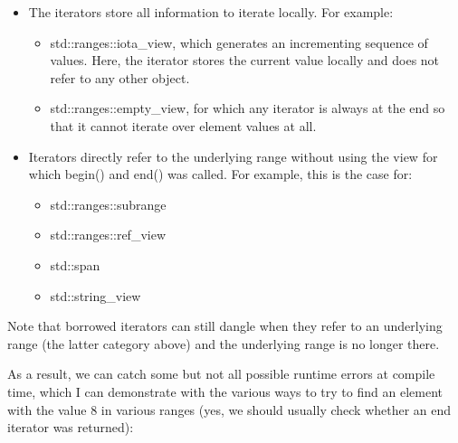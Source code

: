\begin{itemize}
\item
The iterators store all information to iterate locally. For example:

\begin{itemize}
\item
std::ranges::iota\_view, which generates an incrementing sequence of values. Here, the iterator stores the current value locally and does not refer to any other object.

\item
std::ranges::empty\_view, for which any iterator is always at the end so that it cannot iterate over element values at all.
\end{itemize}

\item
Iterators directly refer to the underlying range without using the view for which begin() and end() was called. For example, this is the case for:

\begin{itemize}
\item
std::ranges::subrange

\item
std::ranges::ref\_view

\item
std::span

\item
std::string\_view
\end{itemize}
\end{itemize}

Note that borrowed iterators can still dangle when they refer to an underlying range (the latter category above) and the underlying range is no longer there.

As a result, we can catch some but not all possible runtime errors at compile time, which I can demonstrate with the various ways to try to find an element with the value 8 in various ranges (yes, we should usually check whether an end iterator was returned):

